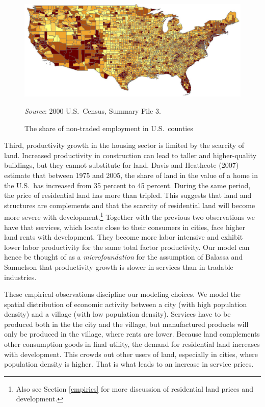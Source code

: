 \documentclass[12pt]{article}
\begin{document}
\begin{figure}[h!]
\centering
  \includegraphics[width=0.7\linewidth]{figures/ntcounties}
  \vspace*{-1em}
  \caption{The share of non-traded employment in U.S.~counties}\label{fig:ntcounties}
  {\small\emph{Source}: 2000 U.S.~Census, Summary File 3.}
\end{figure}

Third, productivity growth in the housing sector is limited by the scarcity of land. Increased productivity in construction can lead to taller and higher-quality buildings, but they cannot substitute for land. Davis and Heathcote (2007) estimate that between 1975 and 2005, the share of land in the value of a home in the U.S.~has increased from 35 percent to 45 percent. During the same period, the price of residential land has more than tripled. This suggests that land and structures are complements and that the scarcity of residential land will become more severe with development.\footnote{Also see Section \ref{empirics} for more discussion of residential land prices and development.}
Together with the previous two observations we have that services, which locate close to their consumers in cities, face higher land rents with development. They become more labor intensive and exhibit lower labor productivity  for the same total factor productivity. Our model can hence be thought of as a \emph{microfoundation} for the assumption of Balassa and Samuelson that productivity growth is slower in services than in tradable industries.

These empirical observations discipline our modeling choices. We model the spatial distribution of economic activity between a city (with high population density) and a village (with low population density). Services have to be produced both in the the city and the village, but manufactured products will only be produced in the village, where rents are lower. Because land complements other consumption goods in final utility, the demand for residential land increases with development. This crowds out other users of land, especially in cities, where population density is higher. That is what leads to an increase in service prices.
\end{document}

